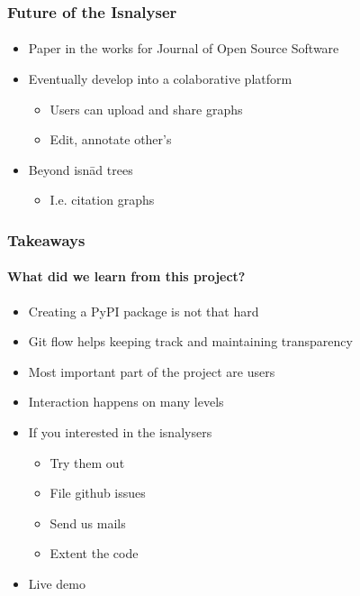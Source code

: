 \documentclass[9pt]{beamer}
\begin{document}
\begin{frame}
\frametitle{Future of the Isnalyser}
\framesubtitle{}
\begin{itemize}
	\item Paper in the works for Journal of Open Source Software
	\item Eventually develop into a colaborative platform
	\begin{itemize}
		\item Users can upload and share graphs
		\item Edit, annotate other's
	\end{itemize}
	\item Beyond isnād trees
	\begin{itemize}
		\item I.e. citation graphs
	\end{itemize}
\end{itemize}
\end{frame}






\begin{frame}
\frametitle{Takeaways}
\framesubtitle{What did we learn from this project?}
\begin{itemize}%
	\item Creating a PyPI package is not that hard
	\item Git flow helps keeping track and maintaining transparency
	\item Most important part of the project are users
	\item Interaction happens on many levels
	\item If you interested in the isnalysers
	\begin{itemize}
		\item Try them out
		\item File github issues
		\item Send us mails
		\item Extent the code
	\end{itemize}
	\item Live demo
\end{itemize}
\end{frame} 
\end{document}
